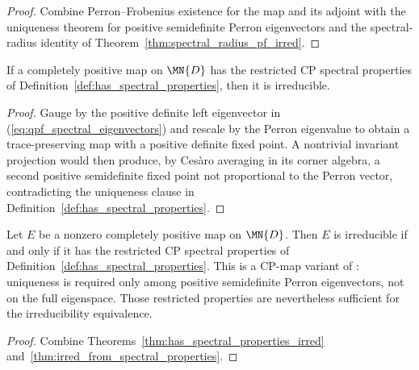 \begin{proof}
    \leanok
    Combine Perron--Frobenius existence for the map and its adjoint with the
    uniqueness theorem for positive semidefinite Perron eigenvectors and the
    spectral-radius identity of
    Theorem~\ref{thm:spectral_radius_pf_irred}.
\end{proof}

\begin{theorem}
    \label{thm:irred_from_spectral_properties}
    \leanok
    If a completely positive map on $\MN{D}$ has the restricted CP spectral properties of
    Definition~\ref{def:has_spectral_properties}, then it is irreducible.
\end{theorem}

\begin{proof}
    \leanok
    Gauge by the positive definite left eigenvector in
    (\ref{eq:qpf_spectral_eigenvectors}) and rescale by the Perron eigenvalue
    to obtain a trace-preserving map with a positive definite fixed point.
    A nontrivial invariant projection would then produce, by Ces\`aro averaging
    in its corner algebra, a second positive semidefinite fixed point not
    proportional to the Perron vector, contradicting the uniqueness clause in
    Definition~\ref{def:has_spectral_properties}.
\end{proof}

\begin{theorem}
    \label{thm:irred_iff_spectral_properties}
    \leanok
    Let $E$ be a nonzero completely positive map on $\MN{D}$.
    Then $E$ is irreducible if and only if it has the restricted CP spectral properties of
    Definition~\ref{def:has_spectral_properties}. This is a CP-map variant of
    \cite[Theorem~6.4]{Wolf2012Quantum}: uniqueness is required only among
    positive semidefinite Perron eigenvectors, not on the full eigenspace.
    Those restricted properties are nevertheless sufficient for the
    irreducibility equivalence.
\end{theorem}

\begin{proof}
    \leanok
    Combine Theorems~\ref{thm:has_spectral_properties_irred}
    and~\ref{thm:irred_from_spectral_properties}.
\end{proof}
